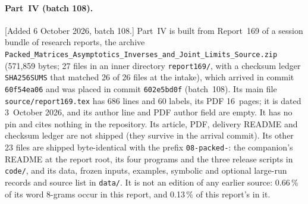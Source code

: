 \documentclass[11pt]{article}
\numberwithin{equation}{section}
\theoremstyle{definition}
\theoremstyle{remark}
\begin{document}
\paragraph{Part~IV (batch 108).}
[Added 6 October 2026, batch 108.] Part~IV is built from Report~169 of a
session bundle of research reports, the archive
\nolinkurl{Packed_Matrices_Asymptotics_Inverses_and_Joint_Limits_Source.zip}
(571,859 bytes; 27 files in an inner directory \texttt{report169/}, with a
checksum ledger \texttt{SHA256SUMS} that matched 26 of 26 files at the
intake), which arrived in commit \texttt{60f54ea06} and was placed in commit
\texttt{602e5bd0f} (batch~108). Its main file \texttt{source/report169.tex}
has 686 lines and 60 labels, its PDF 16~pages; it is dated 3~October 2026,
and its author line and PDF author field are empty. It has no pin and cites
nothing in the repository. Its article, PDF, delivery README and checksum
ledger are not shipped (they survive in the arrival commit). Its other 23
files are shipped byte-identical with the prefix \texttt{08-packed-}: the
companion's README at the report root, its four programs and the three
release scripts in \texttt{code/}, and its data, frozen inputs, examples,
symbolic and optional large-run records and source list in \texttt{data/}.
It is not an edition of any earlier source: 0.66\,\% of its word 8-grams
occur in this report, and 0.13\,\% of this report's in it.
\end{document}
